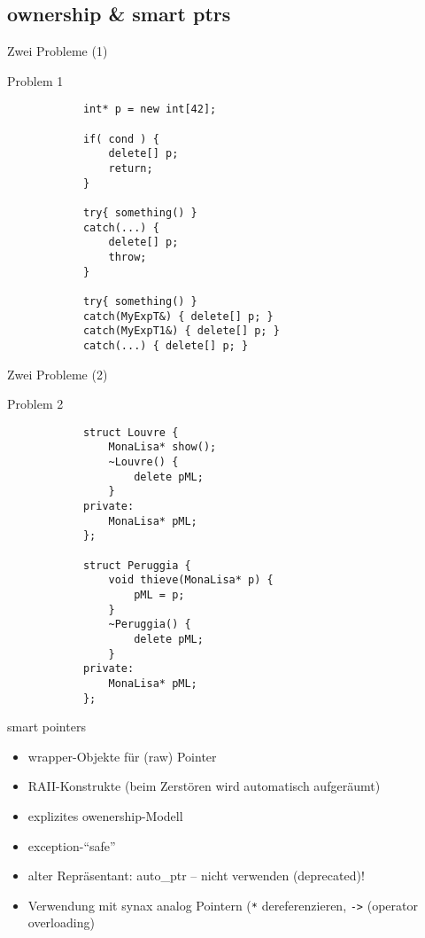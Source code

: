 \subsection{ownership \& smart ptrs}

\begin{frame}[fragile]{Zwei Probleme (1)}
	\begin{block}{Problem 1}
		\begin{lstlisting}
			int* p = new int[42];
			
			if( cond ) {
				delete[] p;
				return;
			}
			
			try{ something() }
			catch(...) {
				delete[] p;
				throw;
			}
			
			try{ something() }
			catch(MyExpT&) { delete[] p; }
			catch(MyExpT1&) { delete[] p; }
			catch(...) { delete[] p; }
		\end{lstlisting}
	\end{block}
\end{frame}

\begin{frame}[fragile]{Zwei Probleme (2)}
	\begin{block}{Problem 2}
		\begin{lstlisting}
			struct Louvre {
				MonaLisa* show();
				~Louvre() {
					delete pML;
				}
			private:
				MonaLisa* pML;
			};
			
			struct Peruggia {
				void thieve(MonaLisa* p) {
					pML = p;
				}
				~Peruggia() {
					delete pML;
				}
			private:
				MonaLisa* pML;
			};
		\end{lstlisting}
	\end{block}
\end{frame}

\begin{frame}{ smart pointers }
	\begin{itemize}
		\item wrapper-Objekte für (raw) Pointer
		\item RAII-Konstrukte (beim Zerstören wird automatisch aufgeräumt)
		\item explizites owenership-Modell
		\item exception-\enquote{safe}
		\item alter Repräsentant: auto\_ptr -- nicht verwenden (deprecated)!
		\item Verwendung mit synax analog Pointern (\texttt{*} dereferenzieren, \texttt{->} (operator overloading)
	\end{itemize}
\end{frame}


